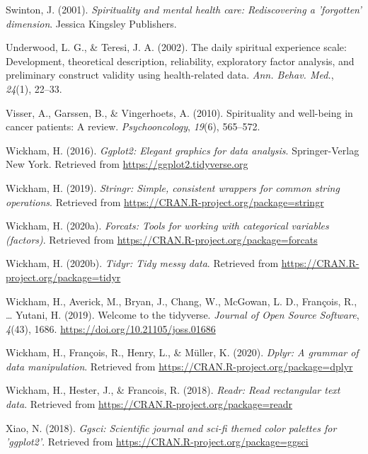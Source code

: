 \documentclass[
  english,
  man]{apa6}
\begin{document}
\leavevmode\hypertarget{ref-Swinton2001-vr}{}%
Swinton, J. (2001). \emph{Spirituality and mental health care: Rediscovering a 'forgotten' dimension}. Jessica Kingsley Publishers.

\leavevmode\hypertarget{ref-Underwood2002-hg}{}%
Underwood, L. G., \& Teresi, J. A. (2002). The daily spiritual experience scale: Development, theoretical description, reliability, exploratory factor analysis, and preliminary construct validity using health-related data. \emph{Ann. Behav. Med.}, \emph{24}(1), 22--33.

\leavevmode\hypertarget{ref-Visser2010-kq}{}%
Visser, A., Garssen, B., \& Vingerhoets, A. (2010). Spirituality and well-being in cancer patients: A review. \emph{Psychooncology}, \emph{19}(6), 565--572.

\leavevmode\hypertarget{ref-R-ggplot2}{}%
Wickham, H. (2016). \emph{Ggplot2: Elegant graphics for data analysis}. Springer-Verlag New York. Retrieved from \url{https://ggplot2.tidyverse.org}

\leavevmode\hypertarget{ref-R-stringr}{}%
Wickham, H. (2019). \emph{Stringr: Simple, consistent wrappers for common string operations}. Retrieved from \url{https://CRAN.R-project.org/package=stringr}

\leavevmode\hypertarget{ref-R-forcats}{}%
Wickham, H. (2020a). \emph{Forcats: Tools for working with categorical variables (factors)}. Retrieved from \url{https://CRAN.R-project.org/package=forcats}

\leavevmode\hypertarget{ref-R-tidyr}{}%
Wickham, H. (2020b). \emph{Tidyr: Tidy messy data}. Retrieved from \url{https://CRAN.R-project.org/package=tidyr}

\leavevmode\hypertarget{ref-R-tidyverse}{}%
Wickham, H., Averick, M., Bryan, J., Chang, W., McGowan, L. D., François, R., \ldots{} Yutani, H. (2019). Welcome to the tidyverse. \emph{Journal of Open Source Software}, \emph{4}(43), 1686. \url{https://doi.org/10.21105/joss.01686}

\leavevmode\hypertarget{ref-R-dplyr}{}%
Wickham, H., François, R., Henry, L., \& Müller, K. (2020). \emph{Dplyr: A grammar of data manipulation}. Retrieved from \url{https://CRAN.R-project.org/package=dplyr}

\leavevmode\hypertarget{ref-R-readr}{}%
Wickham, H., Hester, J., \& Francois, R. (2018). \emph{Readr: Read rectangular text data}. Retrieved from \url{https://CRAN.R-project.org/package=readr}

\leavevmode\hypertarget{ref-R-ggsci}{}%
Xiao, N. (2018). \emph{Ggsci: Scientific journal and sci-fi themed color palettes for 'ggplot2'}. Retrieved from \url{https://CRAN.R-project.org/package=ggsci}
\end{document}

